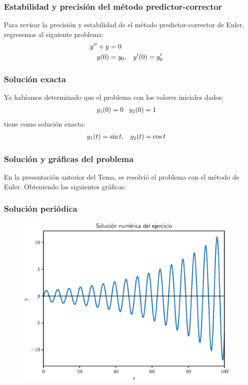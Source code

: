 \documentclass[12pt]{beamer}
\begin{document}
\begin{frame}
\frametitle{Estabilidad y precisión del método predictor-corrector}
Para revisar la precisión y estabilidad de el método predictor-corrector de Euler, regresemos al siguiente problema:
\pause
\begin{align}
{y}^{\prime \prime} + y &= 0 \label{eq:ecuacion_12_19} \\
y(0) &=  y_{0}, \hspace{0.3cm} {y}^{\prime} (0) = {y}^{\prime}_{0} \label{ec:ecuacion_12_20}
\end{align}
\end{frame}
\begin{frame}
\frametitle{Solución exacta}
Ya habíamos determinado que el problema con los valores iniciales dados:
\pause
\begin{align*}
y_{1} (0) = 0 \hspace{0.3cm} y_{2} (0) = 1
\end{align*}
tiene como solución exacta:
\pause
\begin{align*}
y_{1} (t) = \sin t, \hspace{0.3cm} y_{2} (t) = \cos t
\end{align*}
\end{frame}
\begin{frame}
\frametitle{Solución y gráficas del problema}
En la presentación anterior del Tema, se resolvió el problema con el método de Euler.
\pause
Obteniendo las siguientes gráficas:
\end{frame}
\begin{frame}
\frametitle{Solución periódica}
\begin{figure}
    \centering
    \includegraphics[scale=0.55]{Imagenes/plot_euler_ejercicio_04.eps}
\end{figure}
\end{frame}
\end{document}
